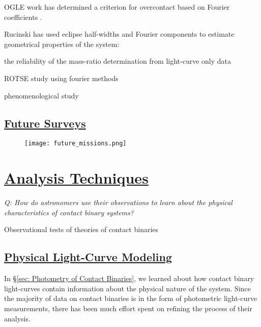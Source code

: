 \documentclass[12pt]{article} %
\numberwithin{equation}{section} %
\begin{document}
OGLE work has determined a criterion for overcontact based on Fourier coefficients \citep{rucinski1997eclipsing}. \citep{rucinski1993simple}

Rucinski has used eclipse half-widths and Fourier components to estimate geometrical properties of the system:

\citep{rucinski1973w}

the reliability of the mass-ratio determination from light-curve only data \citep{hambalek2013reliability}

ROTSE study using fourier methods \citep{coker2013study}

phenomenological study \citep{andronov2012phenomenological}

\subsection[Future Surveys]{\hyperlink{toc}{Future Surveys}}

\begin{figure}[H]
\centering
\texttt{[image: future\_missions.png]}
\caption{}
\label{fig: future_missions}
\end{figure}



\section[Analysis Techniques]{\hyperlink{toc}{Analysis Techniques}} \label{sec: analysis_techniques}

\emph{Q: How do astronomers use their observations to learn about the physical characteristics of contact binary systems?}

Observational tests of theories of contact binaries \citet{lucy1979observational}

\subsection[Physical Light-Curve Modeling]{\hyperlink{toc}{Physical Light-Curve Modeling}} \label{sec: Physical Light-Curve Modeling}

In \S\ref{sec: Photometry of Contact Binaries}, we learned about how contact binary light-curves contain information about the physical nature of the system. Since the majority of data on contact binaries is in the form of photometric light-curve measurements, there has been much effort spent on refining the process of their analysis.
\end{document}
